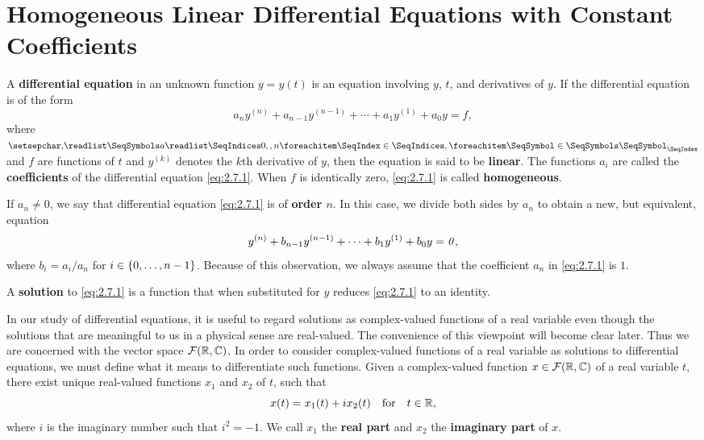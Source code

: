\section{Homogeneous Linear Differential Equations with Constant Coefficients}\label{sec:2.7}

\begin{defn}\label{2.7.1}
	A \textbf{differential equation} in an unknown function \(y = y(t)\) is an equation involving \(y\), \(t\), and derivatives of \(y\).
	If the differential equation is of the form
	\begin{equation}\label{eq:2.7.1}
		a_n y^{(n)} + a_{n - 1} y^{(n - 1)} + \cdots + a_1 y^{(1)} + a_0 y = f,
	\end{equation}
	where \(\seq{a}{0,,n}\) and \(f\) are functions of \(t\) and \(y^{(k)}\) denotes the \(k\)th derivative of \(y\), then the equation is said to be \textbf{linear}.
	The functions \(a_i\) are called the \textbf{coefficients} of the differential equation \cref{eq:2.7.1}.
	When \(f\) is identically zero, \cref{eq:2.7.1} is called \textbf{homogeneous}.

	If \(a_n \neq 0\), we say that differential equation \cref{eq:2.7.1} is of \textbf{order \(n\)}.
	In this case, we divide both sides by \(a_n\) to obtain a new, but equivalent, equation
	\[
		y^{(n)} + b_{n - 1} y^{(n - 1)} + \cdots + b_1 y^{(1)} + b_0 y = \mathit{0},
	\]
	where \(b_i = a_i / a_n\) for \(i \in \left\lbrace0, \dots, n - 1\right\rbrace\).
	Because of this observation, we always assume that the coefficient \(a_n\) in \cref{eq:2.7.1} is \(1\).

	A \textbf{solution} to \cref{eq:2.7.1} is a function that when substituted for \(y\) reduces \cref{eq:2.7.1} to an identity.
\end{defn}

\begin{defn}\label{2.7.2}
	In our study of differential equations, it is useful to regard solutions as complex-valued functions of a real variable even though the solutions that are meaningful to us in a physical sense are real-valued.
	The convenience of this viewpoint will become clear later.
	Thus we are concerned with the vector space \(\mathcal{F}(\mathbb{R}, \mathbb{C})\).
	In order to consider complex-valued functions of a real variable as solutions to differential equations, we must define what it means to differentiate such functions.
	Given a complex-valued function \(x \in \mathcal{F}(\mathbb{R}, \mathbb{C})\) of a real variable \(t\), there exist unique real-valued functions \(x_1\) and \(x_2\) of \(t\), such that
	\[
		x(t) = x_1(t) + i x_2(t) \quad \text{for} \quad t \in \mathbb{R},
	\]
	where \(i\) is the imaginary number such that \(i^2 = -1\).
	We call \(x_1\) the \textbf{real part} and \(x_2\) the \textbf{imaginary part} of \(x\).
\end{defn}

